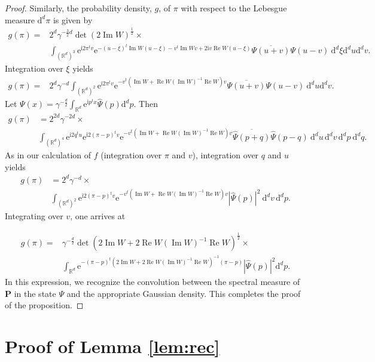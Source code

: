 \documentclass[11pt]{article}
\renewcommand{\Re}{\operatorname{Re}}
\renewcommand{\Im}{\operatorname{Im}}
\renewcommand\i{\mathrm{i}}
\newcommand{\e}{{\mathrm e}}
\renewcommand{\d}{{\mathrm d}}
\begin{document}
\begin{proof}
	Similarly, the probability density, $g$, of $\pi$ with respect to the Lebesgue measure $\d^{d} \pi$ is given by
	\begin{align*}
	g(\pi)=&2^d\gamma^{-\frac32d}\det(2\Im W)^{\frac12}\times\\
	&\int_{(\mathbb R^d)^3}\e^{\i2\pi^tv}\e^{-(u-\xi)^t\Im W(u-\xi) -v^t\Im Wv +2\i v\Re W(u-\xi)}\overline{\Psi(u+v)}\Psi(u-v)\ \d^{d}\xi\d^{d} u \d^{d} v.
	\end{align*}
	Integration over $\xi$ yields
	\begin{align*}
	g(\pi)=&2^d\gamma^{-d}\int_{(\mathbb R^d)^2}\e^{\i2\pi^tv}\e^{-v^t(\Im W +\Re W(\Im W)^{-1}\Re W)v}\overline{\Psi(u+v)}\Psi(u-v)\ \d^{d} u \d^{d} v.
	\end{align*}
	Let $\Psi(x)=\gamma^{-\frac d2}\int_{\mathbb R^d} \e^{\i p^tx} \widehat{\Psi}(p)\d^{d} p$. Then
	\begin{align*}
	g(\pi)& = 2^{2d}\gamma^{-2d}\times\\
	&\int_{(\mathbb R^d)^4}\e^{\i 2q^tu}\e^{\i 2(\pi-p)^tv}\e^{-v^t(\Im W +\Re W(\Im W)^{-1}\Re W)v}\overline{\widehat{\Psi}(p+q)}\widehat{\Psi}(p-q)\ \d^{d} u\, \d^{d} v\, \d^{d} p\ \d^{d} q.
	\end{align*}
	As in our calculation of $f$ (integration over $\pi$ and $v$), integration over $q$ and $u$ yields
	\begin{align*}
	g(\pi)&=2^{d}\gamma^{-d}\times\\
	&\int_{(\mathbb R^d)^2}\e^{\i2(\pi-p)^tv}\e^{-v^t(\Im W +\Re W(\Im W)^{-1}\Re W)v}|\widehat{\Psi}(p)|^2\ \d^{d} v \,\d^{d} p.
	\end{align*}
	Integrating over $v$, one arrives at 

	\begin{align*}
	g(\pi)=&\gamma^{-\frac d2}\det(2\Im W +2\Re W(\Im W)^{-1}\Re W)^{\frac12}\times\\
	&\int_{\mathbb R^d}\e^{-(\pi-p)^t( {2}\Im W+
	{2}\Re W(\Im W)^{-1}\Re W)^{-1}(\pi-p)}|\widehat{\Psi}(p)|^2\d^{d} p.
	\end{align*}
	In this expression, we recognize the convolution between the spectral measure of $\mathbf P$ in the state $\Psi$ and the appropriate Gaussian density. This completes the proof of the proposition.
\end{proof}

\section{Proof of Lemma \ref{lem:rec}}\label{Pf}
\end{document}

